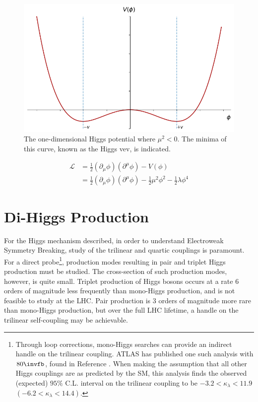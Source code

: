 \begin{figure}[!ht]
    \centering
    \includegraphics[width=\textwidth]{chapters/chapter1_theory/images/higgs-2d-vev.png}
    \caption{The one-dimensional Higgs potential where $\mu^2 <0$. The minima of this curve, known as the Higgs \gls{vev}, is indicated.}
    \label{fig:higgs-potential}
\end{figure}


\begin{equation} \label{higgs-lagrangian}
    \begin{aligned}
        \mathcal{L} &= \frac{1}{2}(\partial_{\mu}\phi)(\partial^{\mu}\phi) - V(\phi)\\
        &= \frac{1}{2}(\partial_{\mu}\phi)(\partial^{\mu}\phi) - \frac{1}{2}\mu^2\phi^2 - \frac{1}{2}\lambda\phi^4
    \end{aligned}
\end{equation}



\section{Di-Higgs Production}

For the Higgs mechanism described, in order to understand Electroweak Symmetry Breaking, study of the trilinear and quartic couplings is paramount. For a direct probe\footnote{Through loop corrections, mono-Higgs searches can provide an indirect handle on the trilinear coupling. ATLAS has published one such analysis with $\unit{80}{\invfb}$, found in Reference \cite{monohiggs-selfcoupling}. When making the assumption that all other Higgs couplings are as predicted by the \gls{SM}, this analysis finds the observed (expected) $95\%$ C.L. interval on the trilinear coupling to be $-3.2 < \kappa_\lambda <11.9$   $(-6.2 < \kappa_\lambda <14.4)$. }, production modes resulting in pair and triplet Higgs production must be studied. The cross-section of such production modes, however, is quite small. Triplet production of Higgs bosons occurs at a rate 6 orders of magnitude less frequently than mono-Higgs production, and is not feasible to study at the \gls{LHC}. Pair production is 3 orders of magnitude more rare than mono-Higgs production, but over the full \gls{LHC} lifetime, a handle on the trilinear self-coupling may be achievable.

